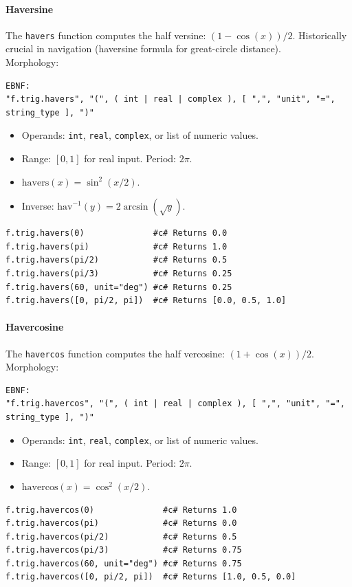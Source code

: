 \paragraph{Haversine}
The \texttt{havers} function computes the half versine: $(1 - \cos(x))/2$. Historically crucial in navigation (haversine formula for great-circle distance).\\
Morphology:
\begin{verbatim}
EBNF:
"f.trig.havers", "(", ( int | real | complex ), [ ",", "unit", "=", string_type ], ")"
\end{verbatim}
\begin{itemize}
\item Operands: \texttt{int}, \texttt{real}, \texttt{complex}, or list of numeric values.
\item Range: $[0, 1]$ for real input. Period: $2\pi$.
\item $\text{havers}(x) = \sin^2(x/2)$.
\item Inverse: $\text{hav}^{-1}(y) = 2\arcsin(\sqrt{y})$.
\end{itemize}
\begin{verbatim}
f.trig.havers(0)              #c# Returns 0.0
f.trig.havers(pi)             #c# Returns 1.0
f.trig.havers(pi/2)           #c# Returns 0.5
f.trig.havers(pi/3)           #c# Returns 0.25
f.trig.havers(60, unit="deg") #c# Returns 0.25
f.trig.havers([0, pi/2, pi])  #c# Returns [0.0, 0.5, 1.0]
\end{verbatim}

\paragraph{Havercosine}
The \texttt{havercos} function computes the half vercosine: $(1 + \cos(x))/2$.\\
Morphology:
\begin{verbatim}
EBNF:
"f.trig.havercos", "(", ( int | real | complex ), [ ",", "unit", "=", string_type ], ")"
\end{verbatim}
\begin{itemize}
\item Operands: \texttt{int}, \texttt{real}, \texttt{complex}, or list of numeric values.
\item Range: $[0, 1]$ for real input. Period: $2\pi$.
\item $\text{havercos}(x) = \cos^2(x/2)$.
\end{itemize}
\begin{verbatim}
f.trig.havercos(0)              #c# Returns 1.0
f.trig.havercos(pi)             #c# Returns 0.0
f.trig.havercos(pi/2)           #c# Returns 0.5
f.trig.havercos(pi/3)           #c# Returns 0.75
f.trig.havercos(60, unit="deg") #c# Returns 0.75
f.trig.havercos([0, pi/2, pi])  #c# Returns [1.0, 0.5, 0.0]
\end{verbatim}

